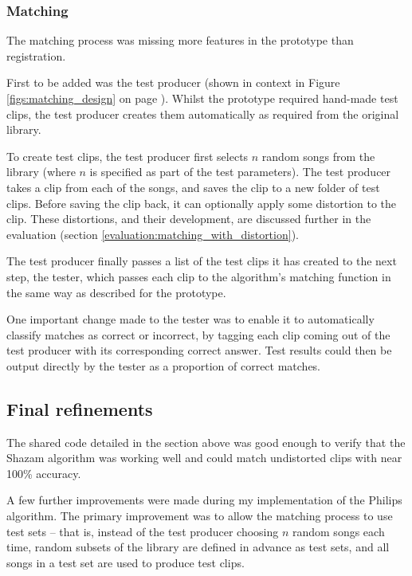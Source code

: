 \documentclass[12pt,a4paper,twoside,openright]{report}
\begin{document}
\subsubsection{Matching}

The matching process was missing more features in the prototype than registration.

First to be added was the test producer (shown in context in Figure \ref{figs:matching_design} on page \pageref{figs:matching_design}). Whilst the prototype required hand-made test clips, the test producer creates them automatically as required from the original library.

To create test clips, the test producer first selects $n$ random songs from the library (where $n$ is specified as part of the test parameters). The test producer takes a clip from each of the songs, and saves the clip to a new folder of test clips. Before saving the clip back, it can optionally apply some distortion to the clip. These distortions, and their development, are discussed further in the evaluation (section \ref{evaluation:matching_with_distortion}).

The test producer finally passes a list of the test clips it has created to the next step, the tester, which passes each clip to the algorithm's matching function in the same way as described for the prototype.

One important change made to the tester was to enable it to automatically classify matches as correct or incorrect, by tagging each clip coming out of the test producer with its corresponding correct answer. Test results could then be output directly by the tester as a proportion of correct matches.


\subsection{Final refinements}

The shared code detailed in the section above was good enough to verify that the Shazam algorithm was working well and could match undistorted clips with near 100\% accuracy.

A few further improvements were made during my implementation of the Philips algorithm. The primary improvement was to allow the matching process to use test sets -- that is, instead of the test producer choosing $n$ random songs each time, random subsets of the library are defined in advance as test sets, and all songs in a test set are used to produce test clips.
\end{document}
